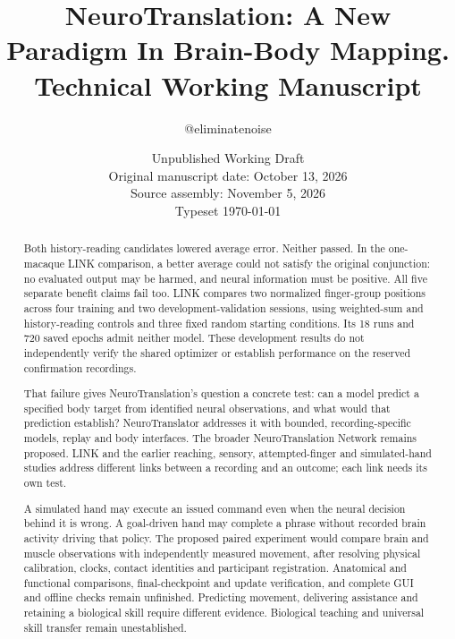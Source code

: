\documentclass[11pt,a4paper]{article}
\begin{document}
\title{NeuroTranslation: A New Paradigm In Brain-Body Mapping.\\[.4em]\large Technical Working Manuscript}
\author{@eliminatenoise}
\date{Unpublished Working Draft\\Original manuscript date: October 13, 2026\\Source assembly: November 5, 2026\\Typeset \today}
\maketitle

\begin{abstract}
Both history-reading candidates lowered average error. Neither passed. In the one-macaque LINK comparison, a better average could not satisfy the original conjunction: no evaluated output may be harmed, and neural information must be positive. All five separate benefit claims fail too. LINK compares two normalized finger-group positions across four training and two development-validation sessions, using weighted-sum and history-reading controls and three fixed random starting conditions. Its 18 runs and 720 saved epochs admit neither model. These development results do not independently verify the shared optimizer or establish performance on the reserved confirmation recordings.

That failure gives NeuroTranslation's question a concrete test: can a model predict a specified body target from identified neural observations, and what would that prediction establish? NeuroTranslator addresses it with bounded, recording-specific models, replay and body interfaces. The broader NeuroTranslation Network remains proposed. LINK and the earlier reaching, sensory, attempted-finger and simulated-hand studies address different links between a recording and an outcome; each link needs its own test.

A simulated hand may execute an issued command even when the neural decision behind it is wrong. A goal-driven hand may complete a phrase without recorded brain activity driving that policy. The proposed paired experiment would compare brain and muscle observations with independently measured movement, after resolving physical calibration, clocks, contact identities and participant registration. Anatomical and functional comparisons, final-checkpoint and update verification, and complete GUI and offline checks remain unfinished. Predicting movement, delivering assistance and retaining a biological skill require different evidence. Biological teaching and universal skill transfer remain unestablished.
\end{abstract}
\end{document}
